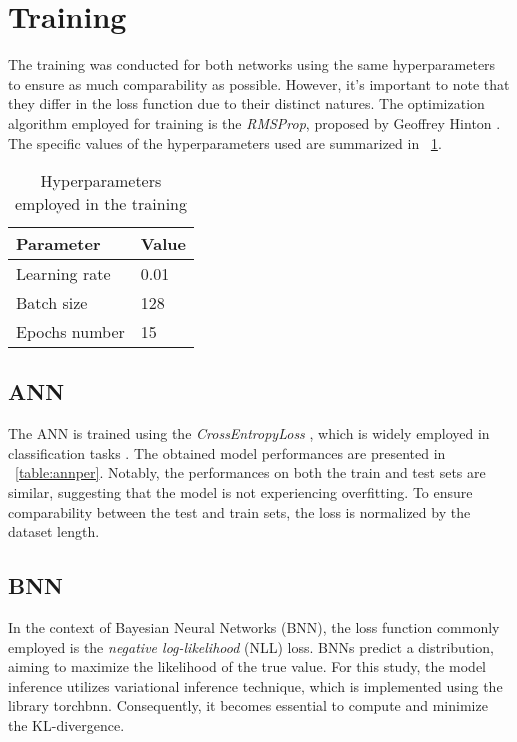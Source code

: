\section{Training}

The training was conducted for both networks using the same hyperparameters to ensure as much comparability as possible. However, it's important to note that they differ in the loss function due to their distinct natures. The optimization algorithm employed for training is the \textit{RMSProp}, proposed by Geoffrey Hinton \cite{OMBGD}. The specific values of the hyperparameters used are summarized in \Tab~\ref{table:HyperParam}.

\begin{table}[h]
	\centering
	\begin{tabular}{|| l | l ||} 
		\hline
		\textbf{Parameter} & \textbf{Value} \\
		\hline
		\hline
		Learning rate & 0.01 \\
		Batch size & 128 \\
		Epochs number & 15 \\	
		\hline
	\end{tabular}	
	\caption{Hyperparameters employed in the training}
	\label{table:HyperParam}
\end{table}


\subsection{ANN}

The ANN is trained using the \textit{CrossEntropyLoss} \cite{CELoss}, which is widely employed in classification tasks \cite{mao2023crossentropy}. The obtained model performances are presented in \Tab~\ref{table:annper}. Notably, the performances on both the train and test sets are similar, suggesting that the model is not experiencing overfitting. To ensure comparability between the test and train sets, the loss is normalized by the dataset length.

\subsection{BNN}

In the context of Bayesian Neural Networks (BNN), the loss function commonly employed is the \textit{negative log-likelihood} (NLL) loss. BNNs predict a distribution, aiming to maximize the likelihood of the true value. For this study, the model inference utilizes variational inference technique, which is implemented using the library torchbnn. Consequently, it becomes essential to compute and minimize the KL-divergence.

